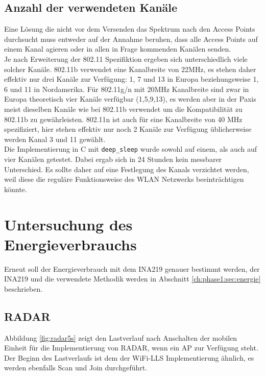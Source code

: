 \subsection{Anzahl der verwendeten Kanäle}
Eine Lösung die nicht vor dem Versenden das Spektrum nach den Access Points durchsucht muss entweder auf der Annahme beruhen, dass alle Access Points auf einem Kanal agieren oder in allen in Frage kommenden Kanälen senden.\\
Je nach Erweiterung der 802.11 Spezifiktion ergeben sich unterschiedlich viele solcher Kanäle.
802.11b verwendet eine Kanalbreite von 22MHz, es stehen daher effektiv nur drei Kanäle zur Verfügung: 1, 7 und 13 in Europa beziehungsweise 1, 6 und 11 in Nordamerika.
Für 802.11g/n mit 20MHz Kanalbreite sind zwar in Europa theoretisch vier Kanäle verfügbar (1,5,9,13), es werden aber in der Paxis meist dieselben Kanäle wie bei 802.11b verwendet um die Kompatibilität zu 802.11b zu gewährleisten.
802.11n ist auch für eine Kanalbreite von 40 MHz spezifiziert, hier stehen effektiv nur noch 2 Kanäle zur Verfügung üblicherweise werden Kanal 3 und 11 gewählt.\\
Die Implementierung in C mit \texttt{deep\_sleep} wurde sowohl auf einem, als auch auf vier Kanälen getestet.
Dabei ergab sich in 24 Stunden kein messbarer Unterschied.
Es sollte daher auf eine Festlegung des Kanals verzichtet werden, weil diese die reguläre Funktionsweise des WLAN Netzwerks beeinträchtigen könnte.


\section{Untersuchung des Energieverbrauchs}
Erneut soll der Energieverbrauch mit dem INA219 genauer bestimmt werden, der INA219 und die verwendete Methodik werden in Abschnitt \ref{ch:phase1:sec:energie} beschrieben.


\subsection{RADAR}
\label{ch:phase2:sec:powerradar}
Abbildung \ref{fig:radar5s} zeigt den Lastverlauf nach Anschalten der mobilen Einheit für die Implementierung von RADAR, wenn ein AP zur Verfügung steht. 
Der Beginn des Lastverlaufs ist dem der WiFi-LLS Implementierung ähnlich, es werden ebenfalls Scan und Join durchgeführt.\\

